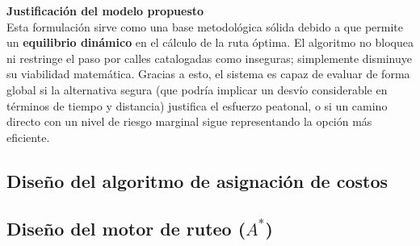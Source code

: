 \vspace{0.5cm}
\noindent \textbf{Justificación del modelo propuesto} \\
Esta formulación sirve como una base metodológica sólida debido a que permite un \textbf{equilibrio dinámico} en el cálculo de la ruta óptima. El algoritmo no bloquea ni restringe el paso por calles catalogadas como inseguras; simplemente disminuye su viabilidad matemática. Gracias a esto, el sistema es capaz de evaluar de forma global si la alternativa segura (que podría implicar un desvío considerable en términos de tiempo y distancia) justifica el esfuerzo peatonal, o si un camino directo con un nivel de riesgo marginal sigue representando la opción más eficiente.

\subsection{Diseño del algoritmo de asignación de costos}

\subsection{Diseño del motor de ruteo (\texorpdfstring{$A^*$}{A*})}
